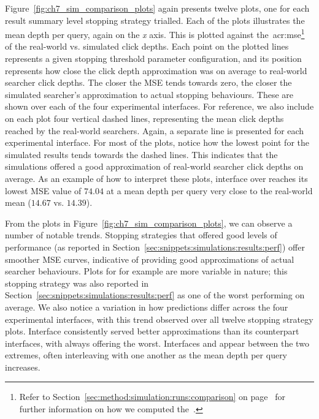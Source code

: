 Figure~\ref{fig:ch7_sim_comparison_plots} again presents twelve plots, one for each result summary level stopping strategy trialled. Each of the plots illustrates the mean depth per query, again on the \emph{x} axis. This is plotted against the~\gls{acr:mse}\footnote{Refer to Section~\ref{sec:method:simulation:runs:comparison} on page~\pageref{sec:method:simulation:runs:comparison} for further information on how we computed the~.} of the real-world vs. simulated click depths. Each point on the plotted lines represents a given stopping threshold parameter configuration, and its position represents how close the click depth approximation was on average to real-world searcher click depths. The closer the MSE tends towards zero, the closer the simulated searcher's approximation to actual stopping behaviours. These are shown over each of the four experimental interfaces. For reference, we also include on each plot four vertical dashed lines, representing the mean click depths reached by the real-world searchers. Again, a separate line is presented for each experimental interface. For most of the plots, notice how the lowest point for the simulated results tends towards the dashed lines. This indicates that the simulations offered a good approximation of real-world searcher click depths on average. As an example of how to interpret these plots, interface  over  reaches its lowest MSE value of $74.04$ at a mean depth per query very close to the real-world mean ($14.67$ vs. $14.39$).

From the plots in Figure~\ref{fig:ch7_sim_comparison_plots}, we can observe a number of notable trends. Stopping strategies that offered good levels of performance (as reported in Section~\ref{sec:snippets:simulations:results:perf}) offer smoother MSE curves, indicative of providing good approximations of actual searcher behaviours. Plots for  for example are more variable in nature; this stopping strategy was also reported in Section~\ref{sec:snippets:simulations:results:perf} as one of the worst performing on average. We also notice a variation in how predictions differ across the four experimental interfaces, with this trend observed over all twelve stopping strategy plots. Interface  consistently served better approximations than its counterpart interfaces, with  always offering the worst. Interfaces  and  appear between the two extremes, often interleaving with one another as the mean depth per query increases.

